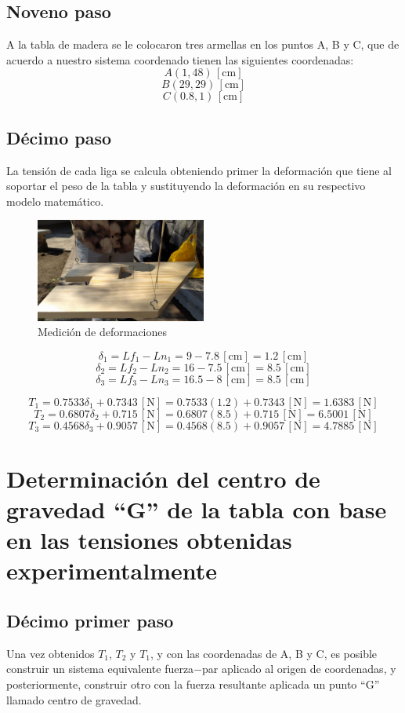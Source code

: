 \documentclass[12pt, titlepage]{report}
\newcommand{\unit}[1]{\ensuremath{\, \mathrm{#1}}}
\begin{document}
    \subsection*{Noveno paso}
    A la tabla de madera se le colocaron tres armellas en los puntos A, B y C, que de acuerdo a nuestro sistema coordenado tienen las siguientes coordenadas:
    $$A(1, 48) \unit{[cm]}$$
    $$B(29, 29) \unit{[cm]}$$
    $$C(0.8, 1) \unit{[cm]}$$

    \subsection*{Décimo paso}
    La tensión de cada liga se calcula obteniendo primer la deformación que tiene al soportar el peso de la tabla y sustituyendo la deformación en su respectivo modelo matemático. 

    \begin{figure}[ht]
        \centering
        \includegraphics[width=0.5\textwidth]{Medicion.jpg}
        \caption{Medición de deformaciones}
    \end{figure}

    $$\delta_1=Lf_1-Ln_1= 9 - 7.8 \unit{[cm]} = 1.2 \unit{[cm]}$$
    $$\delta_2=Lf_2-Ln_2= 16 - 7.5 \unit{[cm]} = 8.5 \unit{[cm]}$$
    $$\delta_3=Lf_3-Ln_3= 16.5 - 8 \unit{[cm]} = 8.5 \unit{[cm]}$$

    $$T_1 = 0.7533\delta_1 + 0.7343 \unit{[N]} = 0.7533(1.2) + 0.7343 \unit{[N]} = 1.6383 \unit{[N]}$$
    $$T_2 = 0.6807\delta_2 + 0.715 \unit{[N]} = 0.6807(8.5)+ 0.715 \unit{[N]} = 6.5001 \unit{[N]}$$
    $$T_3 = 0.4568\delta_3 + 0.9057 \unit{[N]} = 0.4568(8.5) + 0.9057 \unit{[N]} = 4.7885 \unit{[N]}$$

    \hfill
    \section{Determinación del centro de gravedad ``G'' de la tabla con base en las tensiones obtenidas experimentalmente}
    \subsection*{Décimo primer paso}
    Una vez obtenidos $T_{1}$, $T_{2}$ y $T_{1}$, y con las coordenadas de A, B y C, es posible construir un sistema equivalente fuerza$-$par aplicado al origen de coordenadas, y posteriormente, construir otro con la fuerza resultante aplicada un punto ``G'' llamado centro de gravedad.
\end{document}
